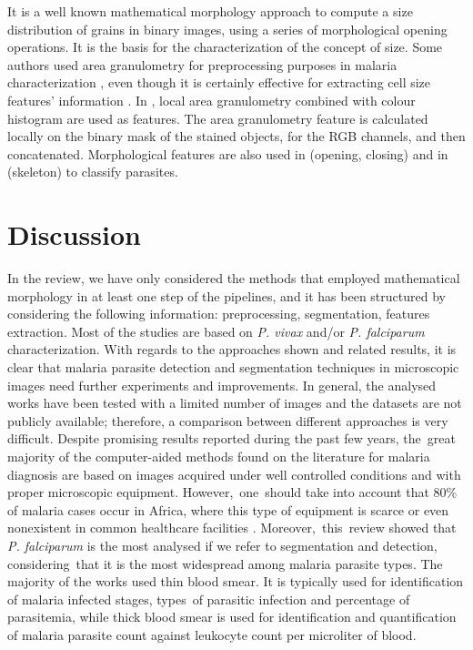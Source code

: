 \documentclass[sensors,review,accept,moreauthors,pdftex,10pt,a4paper]{mdpi}
\begin{document}
It is a well known mathematical morphology approach to compute a size distribution of grains in binary images, using a series of morphological opening operations. It is the basis for the characterization of the concept of size. Some authors used area granulometry for preprocessing purposes in malaria characterization \cite{Tek2010}, even though it is certainly effective for extracting cell size features' information \cite{Springl2009,Tek2006,Malihi2013}. In \cite{Tek2010}, local area granulometry combined with colour histogram are used as features. The area granulometry feature is calculated locally on the binary mask of the stained objects, for the RGB channels, and then concatenated. Morphological features are also used
in \cite{Das2011} (opening, closing) and in \cite{DiRuberto2002} (skeleton) to classify parasites.

%

\section{Discussion}\label{s4}
In the review, we have only considered the methods that employed mathematical morphology in at least one step of the pipelines, and it has been structured by considering the following information: preprocessing, segmentation, features extraction.
Most of the studies are based on \emph{P. vivax} and/or \emph{P. falciparum} characterization.
With regards to the approaches shown and related results, it is clear that malaria parasite detection and segmentation techniques in microscopic images need further experiments and improvements. In general, the analysed works have been tested with a limited number of images and the datasets are not publicly available; therefore, a comparison between different approaches is very difficult. Despite promising results reported during the past few years, the~great majority of the computer-aided methods found on the 
literature for malaria diagnosis are based on images acquired under well controlled conditions and with proper microscopic equipment. \mbox{However, one should} take into account that 80\% of malaria cases occur in Africa, where this type of equipment is scarce or even nonexistent in common healthcare facilities \cite{Rosado2017}.
\mbox{Moreover, this review} showed that \emph{P. falciparum} is the most analysed if we refer to segmentation and detection, considering~that it is the most widespread among malaria parasite types.
The majority of the works used thin blood smear. It is typically used for identification of malaria infected stages, types~of parasitic infection and percentage of parasitemia, while thick blood smear is used for identification and quantification of malaria parasite count against leukocyte count per microliter of blood.
\end{document}
